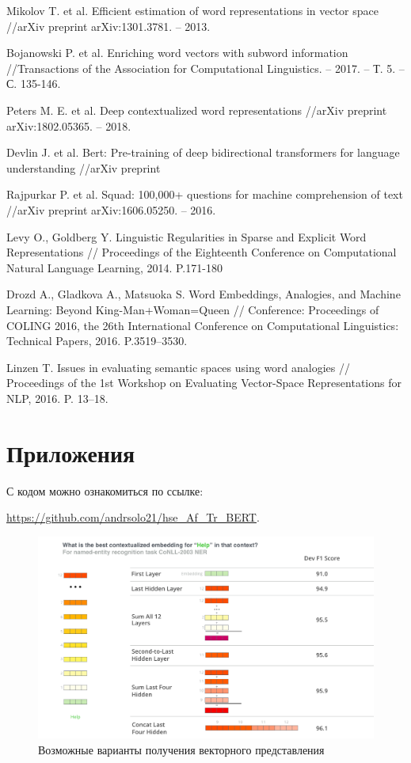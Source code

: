 \documentclass[a4paper,14pt]{article}
\begin{document}
	\begin{thebibliography}{9} 
		Mikolov T. et al. Efficient estimation of word representations in vector space //arXiv preprint arXiv:1301.3781. – 2013.	
		
		Bojanowski P. et al. Enriching word vectors with subword information //Transactions of the Association for Computational Linguistics. – 2017. – Т. 5. – С. 135-146.
		
		Peters M. E. et al. Deep contextualized word representations //arXiv preprint arXiv:1802.05365. – 2018.
		
		Devlin J. et al. Bert: Pre-training of deep bidirectional transformers for language understanding //arXiv preprint
		
		Rajpurkar P. et al. Squad: 100,000+ questions for machine comprehension of text //arXiv preprint arXiv:1606.05250. – 2016.
		
		Levy O., Goldberg Y. Linguistic Regularities in Sparse and Explicit Word 	Representations // Proceedings of the Eighteenth Conference on Computational Natural Language Learning, 2014. P.171-180
	
		
		Drozd A., Gladkova A., Matsuoka S. Word Embeddings, Analogies, and Machine Learning: Beyond King-Man+Woman=Queen // Conference: Proceedings of COLING 2016, the 26th International Conference on Computational Linguistics: Technical Papers, 2016. 
		P.3519–3530.
		
		Linzen T. Issues in evaluating semantic spaces using word analogies // Proceedings of the 1st Workshop on Evaluating Vector-Space Representations for NLP, 2016. P. 13–18.
		
		
	\end{thebibliography}
	
	
	\pagebreak
	\section{Приложения}
	
	С кодом можно ознакомиться по ссылке:

 \href{https://github.com/andrsolo21/hse_Af_Tr_BERTn}{https://github.com/andrsolo21/hse\_Af\_Tr\_BERT}.
	

	
\begin{figure}[H]
	\centering
	\includegraphics[width=0.7\linewidth]{image/irvrsv9mefroz7io6ilnjng3fo4}
	\caption{Возможные варианты получения векторного представления}
	\label{fig:dif_vars_get_v}
\end{figure}
\end{document}
